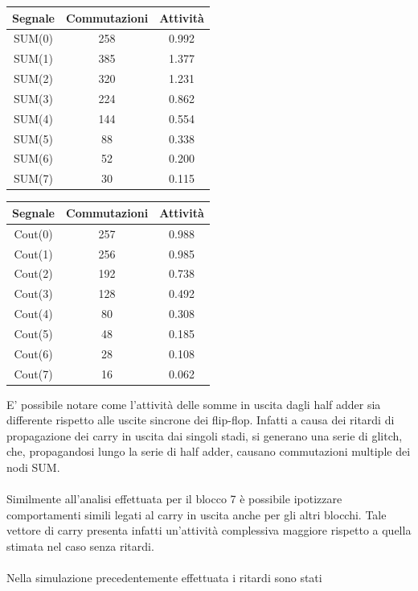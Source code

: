 \documentclass[11pt,  english, makeidx, a4paper, titlepage, oneside]{book}
\begin{document}
\begin{center}
	\begin{tabular}{|c|c|c|}
	\hline
	Segnale & Commutazioni & Attività \\ 
	\hline
	SUM(0) & 258  & 0.992  \\
	\hline
	SUM(1) & 385  & 1.377  \\
	\hline
	SUM(2) & 320  &  1.231  \\
	\hline
	SUM(3) & 224  & 0.862  \\
	\hline
	SUM(4) & 144  & 0.554  \\
	\hline
	SUM(5) & 88  & 0.338  \\
	\hline
	SUM(6) & 52  & 0.200  \\
	\hline
	SUM(7) & 30  & 0.115  \\
	\hline
	\end{tabular}	
	\begin{tabular}{|c|c|c|}
	\hline
	Segnale & Commutazioni & Attività \\ 
	\hline
	Cout(0) & 257  & 0.988  \\
	\hline
	Cout(1) & 256  & 0.985  \\
	\hline
	Cout(2) & 192  & 0.738  \\
	\hline
	Cout(3) & 128  & 0.492  \\
	\hline
	Cout(4) & 80  & 0.308  \\
	\hline
	Cout(5) & 48  & 0.185  \\
	\hline
	Cout(6) & 28  & 0.108  \\
	\hline
	Cout(7) & 16  & 0.062  \\
	\hline
	\end{tabular}
\end{center}
\vspace{0.3cm}
E' possibile notare come l'attività delle somme in uscita dagli
half adder sia differente rispetto alle uscite sincrone dei flip-flop.
Infatti a causa dei ritardi di propagazione dei carry in uscita dai 
singoli stadi, si generano una serie di glitch, che, propagandosi lungo
la serie di half adder, causano commutazioni multiple dei nodi SUM.
\\\\
Similmente all'analisi effettuata per il blocco 7 è possibile ipotizzare
comportamenti simili legati al carry in uscita anche per gli altri blocchi.
Tale vettore di carry presenta infatti un'attività complessiva maggiore 
rispetto a quella stimata nel caso senza ritardi.
\\\\
Nella simulazione precedentemente effettuata i ritardi sono stati
\end{document}
